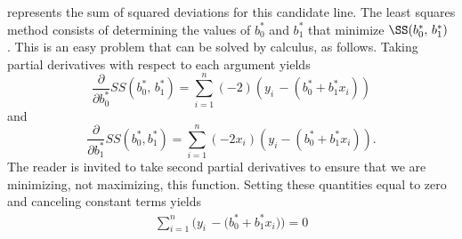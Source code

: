 \documentclass[11pt]{article}
\begin{document}
 represents the sum of squared deviations for this candidate line. The least squares
 method consists of determining the values of \(b_{0}^{*}\) and \(b_{1}^{*}\) that minimize \(\SS( b_{0}^{\ast} , \, b_{1}^{\ast} )\) .
 This is an easy problem that can be solved by calculus, as follows. Taking partial
derivatives with respect to each argument yields
\[
\frac{\partial} {\partial b_{0}^{*}} S S ( b_{0}^{*} , \, b_{1}^{*} )=\sum_{i=1}^{n} (-2 ) \left( y_{i} \,-\left( b_{0}^{*}+b_{1}^{*} x_{i} \right) \right)
\]
and
\[
\frac{\partial} {\partial b_{1}^{*}} S S ( b_{0}^{*} , b_{1}^{*} )=\sum_{i=1}^{n} (-2 x_{i} ) \left( y_{i}-\left( b_{0}^{*}+b_{1}^{*} x_{i} \right) \right) .
\]
The reader is invited to take second partial derivatives to ensure that we are
minimizing, not maximizing, this function. Setting these quantities equal to zero
 and canceling constant terms yields
\[
\begin{aligned} {\sum_{i=1}^{n} \big( y_{i} \,-\big( b_{0}^{\ast}+b_{1}^{\ast} x_{i} \big) \big)=0} \\ \end{aligned}
\]
\end{document}
